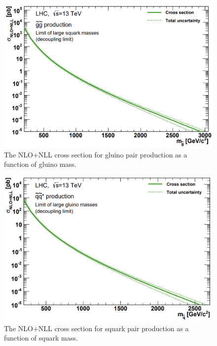 \begin{figure}[h]
	\centering
	\includegraphics[width=0.9\linewidth]{Figures/gluinoxsec}
	\caption[Theoretical cross section gluino pair production as a function of gluino mass]{The NLO+NLL cross section for gluino pair production as a function of gluino mass.}
	\label{fig:gluinoxsec}
\end{figure}

\begin{figure}[h]
	\centering
	\includegraphics[width=0.9\linewidth]{Figures/squarkxsec}
	\caption[Theoretical cross section for squark pair production as a function of squark mass]{The NLO+NLL cross section for squark pair production as a function of squark mass.}
	\label{fig:squarkxsec}
\end{figure}




